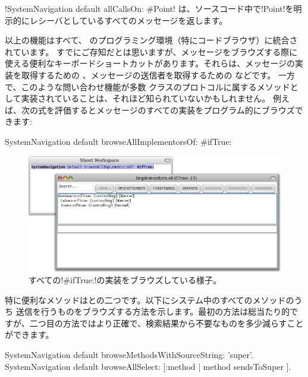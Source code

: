 \documentclass[a4paper,10pt,twoside]{book}
\begin{document}
\ct!SystemNavigation default allCallsOn: #Point! は、ソースコード中で\ct!Point!を明示的にレシーバとしているすべてのメッセージを返します。

以上の機能はすべて、 \pharo のプログラミング環境（特にコードブラウザ）に統合されています。
すでにご存知だとは思いますが、メッセージをブラウズする際に使える便利なキーボードショートカットがあります。それらは、メッセージの実装を取得するための  、メッセージの送信者を取得するための  などです。
一方で、このような問い合わせ機能が多数 クラスのプロトコルに属するメソッドとして実装されていることは、それほど知られていないかもしれません。
例えば、次の式を評価するとメッセージのすべての実装をプログラム的にブラウズできます:
\begin{code}{}
SystemNavigation default browseAllImplementorsOf: #ifTrue:
\end{code}

\begin{figure}[ht]\centering
	\includegraphics[width=\linewidth]{implementors}
	\caption{すべての\ct!\#ifTrue:!の実装をブラウズしている様子。}
\end{figure}

特に便利なメソッドはとの二つです。以下にシステム中のすべてのメソッドのうち \super 送信を行うものをブラウズする方法を示します。最初の方法は総当たり的ですが、二つ目の方法ではより正確で、検索結果から不要なものを多少減らすことができます。
\begin{code}{}
SystemNavigation default browseMethodsWithSourceString: 'super'.
SystemNavigation default browseAllSelect: [:method | method sendsToSuper ].
\end{code}
\end{document}
